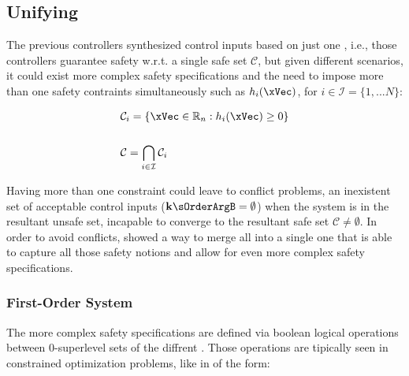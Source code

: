 \subsection{Unifying }
\label{sub:unifying_CBF}

The previous controllers synthesized control inputs based on just one , i.e., those controllers guarantee safety w.r.t. a single safe set \(\mathcal{C}\), but given different scenarios, it could exist more complex safety specifications and the need to impose more than one safety contraints simultaneously such as  \(h_i(\xVec)\), for \(i \in  \mathcal{I}=\{1,...N\}\):

\begin{align}
    & \mathcal{C}_i = \{ \xVec \in \mathbb{R}_n: h_i(\xVec) \geq 0\}
    \label{eq:Multiple_Safe_Sets} \\ 
    \notag\\
    & \mathcal{C} = \bigcap_{i \in \mathcal{I}} \mathcal{C}_i 
    \label{eq:Safe_Set_of_multiple}
\end{align}

Having more than one constraint could leave to conflict problems, an inexistent set of acceptable control inputs (\(\mathbf{k}\sOrderArgB = \emptyset\)) when the system is in the resultant unsafe set, incapable to converge to the resultant safe set \(\mathcal{C} \neq \emptyset\). In order to avoid conflicts, \cite{molnar2023composing} showed a way to merge all  into a single one that is able to capture all those safety notions and allow for even more complex safety specifications. \\


\subsubsection{First-Order System}
\label{subsub:uniCBF_firstOrder_system}

The more complex safety specifications are defined via boolean logical operations between 0-superlevel sets of the diffrent . Those operations are tipically seen in constrained optimization problems, like in  of the form:


